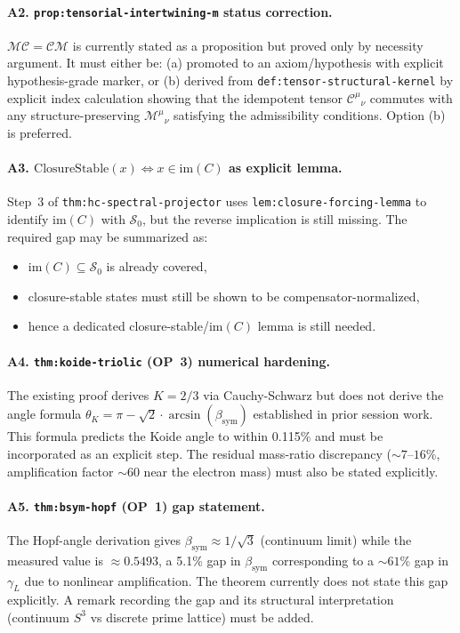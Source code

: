 \documentclass[12pt,a4paper]{article}
\begin{document}
\paragraph{A2. \texttt{prop:tensorial-intertwining-m} status correction.}
$\mathcal{M}\mathcal{C} = \mathcal{C}\mathcal{M}$ is currently stated as a
proposition but proved only by necessity argument. It must either be:
(a) promoted to an axiom/hypothesis with explicit hypothesis-grade marker, or
(b) derived from \texttt{def:tensor-structural-kernel} by explicit index
calculation showing that the idempotent tensor $\mathcal{C}^\mu{}_\nu$ commutes
with any structure-preserving $\mathcal{M}^\mu{}_\nu$ satisfying the
admissibility conditions. Option (b) is preferred.

\paragraph{A3. $\mathrm{ClosureStable}(x) \Leftrightarrow x \in \mathrm{im}(C)$ as
explicit lemma.}
Step~3 of \texttt{thm:hc-spectral-projector} uses \texttt{lem:closure-forcing-lemma} to identify $\mathrm{im}(C)$ with $\mathcal S_0$, but the reverse implication is still missing. The required gap may be summarized as:
\begin{itemize}[leftmargin=1.8em]
\item $\mathrm{im}(C) \subseteq \mathcal S_0$ is already covered,
\item closure-stable states must still be shown to be compensator-normalized,
\item hence a dedicated closure-stable/im$(C)$ lemma is still needed.
\end{itemize}

\paragraph{A4. \texttt{thm:koide-triolic} (OP~3) numerical hardening.}
The existing proof derives $K = 2/3$ via Cauchy-Schwarz but does not
derive the angle formula
$\theta_K = \pi - \sqrt{2}\cdot\arcsin(\beta_{\mathrm{sym}})$
established in prior session work. This formula predicts the Koide angle
to within 0.115\% and must be incorporated as an explicit step.
The residual mass-ratio discrepancy ($\sim 7$--$16\%$, amplification
factor $\sim 60$ near the electron mass) must also be stated explicitly.

\paragraph{A5. \texttt{thm:bsym-hopf} (OP~1) gap statement.}
The Hopf-angle derivation gives $\beta_{\mathrm{sym}} \approx 1/\sqrt{3}$
(continuum limit) while the measured value is $\approx 0.5493$, a 5.1\% gap
in $\beta_{\mathrm{sym}}$ corresponding to a $\sim 61\%$ gap in $\gamma_L$
due to nonlinear amplification. The theorem currently does not state this gap
explicitly. A remark recording the gap and its structural interpretation
(continuum $S^3$ vs discrete prime lattice) must be added.
\end{document}
